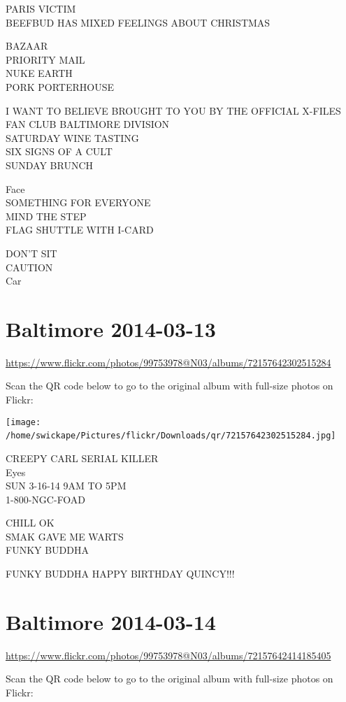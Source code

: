 \documentclass[10pt,letterpaper]{article}
\begin{document}
PARIS VICTIM\\
BEEFBUD HAS MIXED FEELINGS ABOUT CHRISTMAS

BAZAAR\\
PRIORITY MAIL\\
NUKE EARTH\\
PORK PORTERHOUSE

I WANT TO BELIEVE BROUGHT TO YOU BY THE OFFICIAL X{-}FILES FAN CLUB BALTIMORE DIVISION\\
SATURDAY WINE TASTING\\
SIX SIGNS OF A CULT\\
SUNDAY BRUNCH

Face\\
SOMETHING FOR EVERYONE\\
MIND THE STEP\\
FLAG SHUTTLE WITH I{-}CARD

DON'T SIT\\
CAUTION\\
Car
\

\section*{Baltimore 2014-03-13}

\url{https://www.flickr.com/photos/99753978@N03/albums/72157642302515284}

Scan the QR code below to go to the original album with full-size photos on Flickr:

\texttt{[image: /home/swickape/Pictures/flickr/Downloads/qr/72157642302515284.jpg]}
\

CREEPY CARL SERIAL KILLER\\
Eyes\\
SUN 3{-}16{-}14 9AM TO 5PM\\
1{-}800{-}NGC{-}FOAD

CHILL OK\\
SMAK GAVE ME WARTS\\
FUNKY BUDDHA

FUNKY BUDDHA HAPPY BIRTHDAY QUINCY!!!
\

\section*{Baltimore 2014-03-14}

\url{https://www.flickr.com/photos/99753978@N03/albums/72157642414185405}

Scan the QR code below to go to the original album with full-size photos on Flickr:
\end{document}
